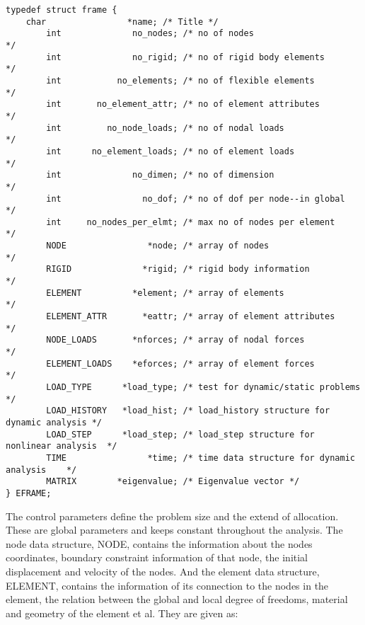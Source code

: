 \begin{footnotesize}
\begin{verbatim}
typedef struct frame {
	char                *name; /* Title */
        int              no_nodes; /* no of nodes                              */
        int              no_rigid; /* no of rigid body elements                */
        int           no_elements; /* no of flexible elements                  */
        int       no_element_attr; /* no of element attributes                 */
        int         no_node_loads; /* no of nodal loads                        */
        int      no_element_loads; /* no of element loads                      */
        int              no_dimen; /* no of dimension                          */ 
        int                no_dof; /* no of dof per node--in global            */
        int     no_nodes_per_elmt; /* max no of nodes per element              */
        NODE                *node; /* array of nodes                           */
        RIGID              *rigid; /* rigid body information                   */
        ELEMENT          *element; /* array of elements                        */
        ELEMENT_ATTR       *eattr; /* array of element attributes              */
        NODE_LOADS       *nforces; /* array of nodal forces                    */
        ELEMENT_LOADS    *eforces; /* array of element forces                  */
        LOAD_TYPE      *load_type; /* test for dynamic/static problems            */
        LOAD_HISTORY   *load_hist; /* load_history structure for dynamic analysis */
        LOAD_STEP      *load_step; /* load_step structure for nonlinear analysis  */
        TIME                *time; /* time data structure for dynamic analysis    */
        MATRIX        *eigenvalue; /* Eigenvalue vector */
} EFRAME;
\end{verbatim}
\end{footnotesize}
  
\vspace{0.05 in}\noindent
The control parameters define the problem size and the extend of allocation.
These are global parameters and keeps constant throughout the analysis.
The node data structure, NODE, contains the information about the nodes
coordinates, boundary constraint information of that node, the initial displacement
and velocity of the nodes. And the element data structure,
ELEMENT, contains the information of its connection to the nodes in the element,
the relation between the global and local degree of freedoms, material and geometry
of the element et al. They are given as:

